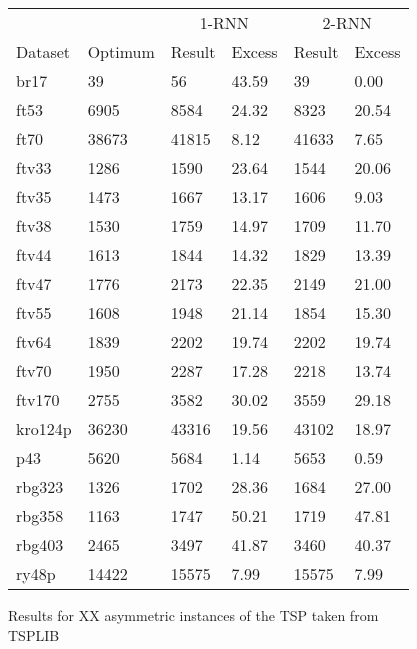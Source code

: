 \begin{figure}[ht]
	\centering
	\begin{minipage}{\linewidth}
		\centering
		\begin{tabular*}{\linewidth}{*{6}{l}}
			\toprule
			&& \multicolumn{2}{c}{1-RNN}& \multicolumn{2}{c}{2-RNN} \\
			\cmidrule(lr){3-4}
			\cmidrule(lr){5-6}
			Dataset & Optimum & Result & Excess & Result & Excess \\
			\midrule
			br17    & 39    & 56    & 43.59 & 39    & 0.00  \\
			ft53    & 6905  & 8584  & 24.32 & 8323  & 20.54 \\
			ft70    & 38673 & 41815 & 8.12  & 41633 & 7.65  \\
			ftv33   & 1286  & 1590  & 23.64 & 1544  & 20.06 \\
			ftv35   & 1473  & 1667  & 13.17 & 1606  & 9.03  \\
			ftv38   & 1530  & 1759  & 14.97 & 1709  & 11.70 \\
			ftv44   & 1613  & 1844  & 14.32 & 1829  & 13.39 \\
			ftv47   & 1776  & 2173  & 22.35 & 2149  & 21.00 \\
			ftv55   & 1608  & 1948  & 21.14 & 1854  & 15.30 \\
			ftv64   & 1839  & 2202  & 19.74 & 2202  & 19.74 \\
			ftv70   & 1950  & 2287  & 17.28 & 2218  & 13.74 \\
			ftv170  & 2755  & 3582  & 30.02 & 3559  & 29.18 \\
			kro124p & 36230 & 43316 & 19.56 & 43102 & 18.97 \\
			p43     & 5620  & 5684  & 1.14  & 5653  & 0.59  \\
			rbg323  & 1326  & 1702  & 28.36 & 1684  & 27.00 \\
			rbg358  & 1163  & 1747  & 50.21 & 1719  & 47.81 \\
			rbg403  & 2465  & 3497  & 41.87 & 3460  & 40.37 \\
			ry48p   & 14422 & 15575 & 7.99  & 15575 & 7.99  \\
			\bottomrule
		\end{tabular*}
	\end{minipage}
	
	\caption{Results for XX asymmetric instances of the TSP taken from TSPLIB \cite{REINELT1995}}
	\label{fig:ATSP}
\end{figure}